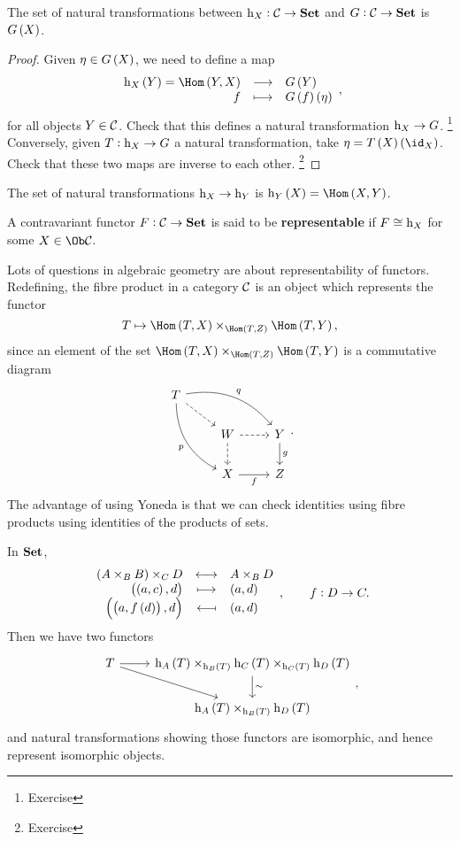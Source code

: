 \begin{lemma}
The set of natural transformations between $ \mathrm{h}_X : \mathcal{C} \to \textbf{Set} $ and $ G : \mathcal{C} \to \textbf{Set} $ is $ G\br{X} $.
\end{lemma}

\begin{proof}
Given $ \eta \in G\br{X} $, we need to define a map
$$ \function{\h_X\br{Y} = \Hom\br{Y, X}}{G\br{Y}}{f}{G\br{f}\br{\eta}}, $$
for all objects $ Y \in \mathcal{C} $. Check that this defines a natural transformation $ \mathrm{h}_X \to G $. \footnote{Exercise} Conversely, given $ T : \mathrm{h}_X \to G $ a natural transformation, take $ \eta = T\br{X}\br{\id_X} $. Check that these two maps are inverse to each other. \footnote{Exercise}
\end{proof}

\begin{corollary}
The set of natural transformations $ \mathrm{h}_X \to \mathrm{h}_Y $ is $ \h_Y\br{X} = \Hom\br{X, Y} $.
\end{corollary}

\pagebreak

\begin{definition*}
A contravariant functor $ F : \mathcal{C} \to \textbf{Set} $ is said to be \textbf{representable} if $ F \cong \mathrm{h}_X $ for some $ X \in \Ob \CCC $.
\end{definition*}

Lots of questions in algebraic geometry are about representability of functors. Redefining, the fibre product in a category $ \mathcal{C} $ is an object which represents the functor
$$ T \mapsto \Hom\br{T, X} \times_{\Hom\br{T, Z}} \Hom\br{T, Y}, $$
since an element of the set $ \Hom\br{T, X} \times_{\Hom\br{T, Z}} \Hom\br{T, Y} $ is a commutative diagram
$$
\begin{tikzcd}
T \arrow[dashed]{dr} \arrow[bend left=30]{drr}{q} \arrow[bend right=30]{ddr}[swap]{p} & & \\
& W \arrow[dashed]{r} \arrow[dashed]{d} & Y \arrow{d}{g} \\
& X \arrow{r}[swap]{f} & Z
\end{tikzcd}.
$$
The advantage of using Yoneda is that we can check identities using fibre products using identities of the products of sets.

\begin{example*}
In $ \textbf{Set} $,
$$ \bijection{\br{A \times_B B} \times_C D}{A \times_B D}{\br{\br{a, c}, d}}{\br{a, d}}{\br{\br{a, f\br{d}}, d}}{\br{a, d}}, \qquad f : D \to C. $$
Then we have two functors
$$
\begin{tikzcd}
T \arrow{r} \arrow{dr} & \h_A\br{T} \times_{\h_B\br{T}} \h_C\br{T} \times_{\h_C\br{T}} \h_D\br{T} \arrow{d}{\sim} \\
& \h_A\br{T} \times_{\h_B\br{T}} \h_D\br{T}
\end{tikzcd},
$$
and natural transformations showing those functors are isomorphic, and hence represent isomorphic objects.
\end{example*}

